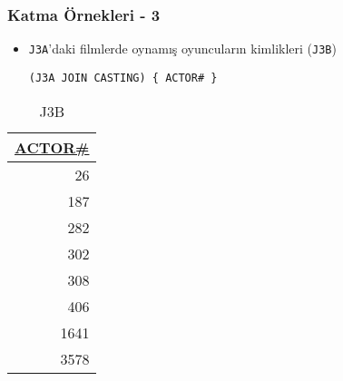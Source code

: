 \documentclass[dvipsnames]{beamer}
\theoremstyle{plain}
\begin{document}
\begin{frame}[fragile]
  \frametitle{Katma Örnekleri - 3}

    \begin{itemize}
      \item  \texttt{J3A}'daki filmlerde oynamış oyuncuların kimlikleri
        (\texttt{J3B})

    \begin{lstlisting}
(J3A JOIN CASTING) { ACTOR# }
    \end{lstlisting}
    \end{itemize}

    \vspace{-10pt}
    \begin{tiny}
    \begin{table}
      \caption{J3B}
      \begin{tabular}{|r|}\hline
\underline{ACTOR\#}\\[2pt]\hline\hline
                 26\\\hline
                187\\\hline
                282\\\hline
                302\\\hline
                308\\\hline
                406\\\hline
               1641\\\hline
               3578\\\hline
      \end{tabular}
    \end{table}
    \end{tiny}
\end{frame}
\end{document}

